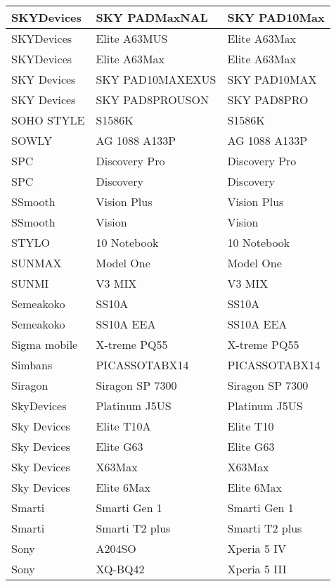 \begin{tabularx}{\linewidth}{|l|X|X|}
        SKYDevices & SKY PADMaxNAL & SKY PAD10Max \\ \hline
        SKYDevices & Elite A63MUS & Elite A63Max \\ \hline
        SKYDevices & Elite A63Max & Elite A63Max \\ \hline
        SKY Devices & SKY PAD10MAXEXUS & SKY PAD10MAX \\ \hline
        SKY Devices & SKY PAD8PROUSON & SKY PAD8PRO \\ \hline
        SOHO STYLE & S1586K & S1586K \\ \hline
        SOWLY & AG 1088 A133P & AG 1088 A133P \\ \hline
        SPC & Discovery Pro & Discovery Pro \\ \hline
        SPC & Discovery & Discovery \\ \hline
        SSmooth & Vision Plus & Vision Plus \\ \hline
        SSmooth & Vision & Vision \\ \hline
        STYLO & 10 Notebook & 10 Notebook \\ \hline
        SUNMAX & Model One & Model One \\ \hline
        SUNMI & V3 MIX & V3 MIX \\ \hline
        Semeakoko & SS10A & SS10A \\ \hline
        Semeakoko & SS10A EEA & SS10A EEA \\ \hline
        Sigma mobile & X-treme PQ55 & X-treme PQ55 \\ \hline
        Simbans & PICASSOTABX14 & PICASSOTABX14 \\ \hline
        Siragon & Siragon SP 7300 & Siragon SP 7300 \\ \hline
        SkyDevices & Platinum J5US & Platinum J5US \\ \hline
        Sky Devices & Elite T10A & Elite T10 \\ \hline
        Sky Devices & Elite G63 & Elite G63 \\ \hline
        Sky Devices & X63Max & X63Max \\ \hline
        Sky Devices & Elite 6Max & Elite 6Max \\ \hline
        Smarti & Smarti Gen 1 & Smarti Gen 1 \\ \hline
        Smarti & Smarti T2 plus & Smarti T2 plus \\ \hline
        Sony & A204SO & Xperia 5 IV \\ \hline
        Sony & XQ-BQ42 & Xperia 5 III \\ \hline

\end{tabularx}
